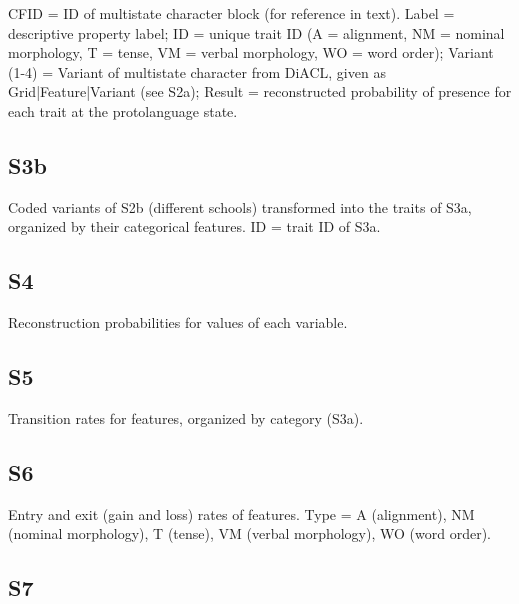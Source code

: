 \documentclass[12pt]{article}
\begin{document}
CFID = ID of multistate character block (for reference in text). Label = descriptive property label; ID = unique trait ID (A = alignment, NM = nominal morphology, T = tense, VM = verbal morphology, WO = word order); Variant (1-4) = Variant of multistate character from DiACL, given as Grid|Feature|Variant (see S2a); Result = reconstructed probability of presence for each trait at the protolanguage state.



\subsection*{S3b}

Coded variants of S2b (different schools) transformed into the traits of S3a, organized by their categorical features. ID = trait ID of S3a.



\subsection*{S4}
Reconstruction probabilities for values of each variable.




\subsection*{S5}
Transition rates for features, organized by category (S3a). %



\subsection*{S6}
Entry and exit (gain and loss) rates of features. %
Type = A (alignment), NM (nominal morphology), T (tense), VM (verbal morphology), WO (word order).



\subsection*{S7}
\end{document}

